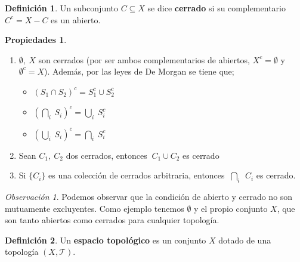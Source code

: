 \documentclass[12pt,twoside]{report}
\newcommand\mc[1]{\mathcal{#1}}
\theoremstyle{azul}
\theoremstyle{azul2}
\theoremstyle{plain}
\theoremstyle{definition}
\newtheorem*{defi}{Definición}
\newtheorem*{propi}{Propiedades}
\theoremstyle{remark}
\newtheorem*{obs}{Observación}
\begin{document}
\begin{defi}
Un subconjunto $C \subseteq X$ se dice \textbf{cerrado} si su complementario $C^c=X-C$ es un abierto.
\end{defi}
\begin{propi}\:
\begin{enumerate}
    \item $\emptyset, \: X$ son cerrados (por ser ambos complementarios de abiertos, $X^c=\emptyset$ y $\emptyset^c=X$). Además, por las leyes de De Morgan se tiene que;
    \begin{itemize}
        \item $(S_1 \cap S_2)^c=S_1^c \cup S_2^c$
        \item $(\underset{i}{\bigcap} \: S_i)^c=\underset{i}{\bigcup} \: S_i^c$
        \item $(\underset{i}{\bigcup} \: S_i)^c=\underset{i}{\bigcap} \: S_i^c$
    \end{itemize}
    \item Sean $C_1, \: C_2$ dos cerrados, entonces $\: C_1 \cup C_2 $ es cerrado 
    \item Si $\{ C_i \}$ es una colección de cerrados arbitraria, entonces $\: \underset{i}{\bigcap} \: \: C_i$ es cerrado.
\end{enumerate}
\end{propi}
\begin{obs}
Podemos observar que la condición de abierto y cerrado no son mutuamente excluyentes. Como ejemplo tenemos $\emptyset$ y el propio conjunto $X$, que son tanto abiertos como cerrados para cualquier topología.
\end{obs}

\begin{defi}
Un \textbf{espacio topológico} es un conjunto $X$ dotado de una topología $(X,\mc{T})$.
\end{defi}
\end{document}
